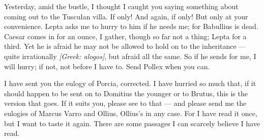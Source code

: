 

 Yesterday, amid the bustle, I thought I caught you saying something about coming out to the Tusculan villa. If only! And again, if only! But only at your convenience. Lepta asks me to hurry to him if he needs me; for Babullius is dead. Caesar comes in for an ounce, I gather, though so far not a thing; Lepta for a third. Yet he is afraid he may not be allowed to hold on to the inheritance --- quite irrationally \textit{[Greek: alogos]}, but afraid all the same. So if he sends for me, I will hurry; if not, not before I have to. Send Pollex when you can.

 I have sent you the eulogy of Porcia, corrected. I have hurried so much that, if it should happen to be sent on to Domitius the younger or to Brutus, this is the version that goes. If it suits you, please see to that --- and please send me the eulogies of Marcus Varro and Ollius, Ollius's in any case. For I have read it once, but I want to taste it again. There are some passages I can scarcely believe I have read.
